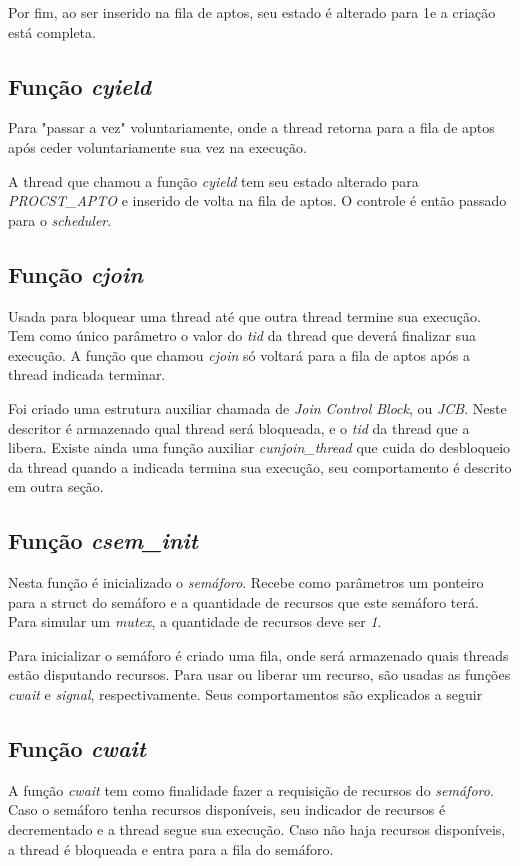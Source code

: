 \documentclass{article}
\begin{document}
Por fim,  ao ser inserido na fila de aptos, seu estado é alterado para 1\footnotemark e a criação está completa.

\subsection{Função \textit{cyield}}
Para "passar a vez" voluntariamente, onde a thread retorna para a fila de aptos após ceder voluntariamente sua vez na execução.

A thread que chamou a função \textit{cyield} tem seu estado alterado para \textit{PROCST\_APTO} e inserido de volta na fila de aptos. O controle é então passado para o \textit{scheduler}.

\subsection{Função \textit{cjoin}}
Usada para bloquear uma thread até que outra thread termine sua execução. Tem como único parâmetro o valor do \textit{tid} da thread que deverá finalizar sua execução.
A função que chamou \textit{cjoin} só voltará para a fila de aptos após a thread indicada terminar.

Foi criado uma estrutura auxiliar chamada de \textit{Join Control Block}, ou \textit{JCB}. Neste descritor é armazenado qual thread será bloqueada, e o \textit{tid} da thread que a libera. Existe ainda uma função auxiliar \textit{cunjoin\_thread} que cuida do desbloqueio da thread quando a indicada termina sua execução, seu comportamento é descrito em outra seção.

\subsection{Função \textit{csem\_init}}
Nesta função é inicializado o \textit{semáforo}. Recebe como parâmetros um ponteiro para a struct do semáforo e a quantidade de recursos que este semáforo terá. Para simular um \textit{mutex}, a quantidade de recursos deve ser \textit{1}.

Para inicializar o semáforo é criado uma fila, onde será armazenado quais threads estão disputando recursos. Para usar ou liberar um recurso, são usadas as funções \textit{cwait} e \textit{signal}, respectivamente. Seus comportamentos são explicados a seguir

\subsection{Função \textit{cwait}}
A função \textit{cwait} tem como finalidade fazer a requisição de recursos do \textit{semáforo}. Caso o semáforo tenha recursos disponíveis, seu indicador de recursos é decrementado e a thread segue sua execução. Caso não haja recursos disponíveis, a thread é bloqueada e entra para a fila do semáforo.
\end{document}
